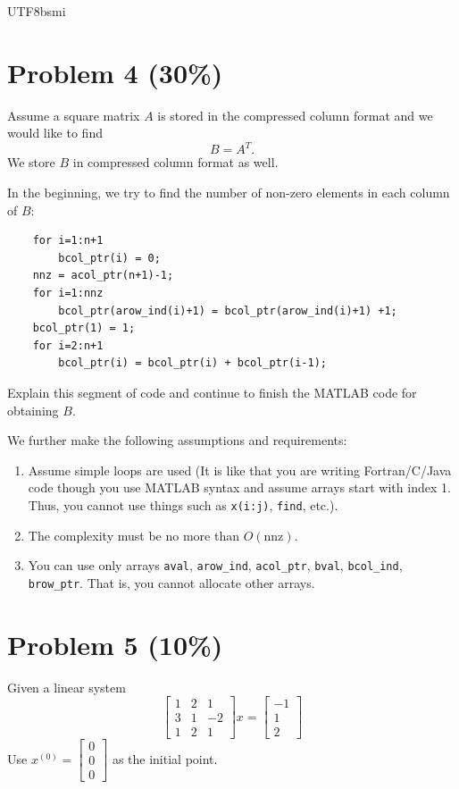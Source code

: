 \documentclass[12pt,a4paper]{article}
\begin{document}
\begin{CJK*}{UTF8}{bsmi}
\vspace{0.5cm}

\section*{Problem 4 (30\%)}
Assume a square matrix $A$ is stored in the compressed column format and we would like to find
\[
B = A^T .
\]
We store $B$ in compressed column format as well.

\vspace{0.25cm}
\noindent In the beginning, we try to find the number of non-zero elements in each column of $B$:

\begin{verbatim}
    for i=1:n+1
        bcol_ptr(i) = 0;
    nnz = acol_ptr(n+1)-1;
    for i=1:nnz
        bcol_ptr(arow_ind(i)+1) = bcol_ptr(arow_ind(i)+1) +1;
    bcol_ptr(1) = 1;
    for i=2:n+1
        bcol_ptr(i) = bcol_ptr(i) + bcol_ptr(i-1);
\end{verbatim}

\noindent Explain this segment of code and continue to finish the MATLAB code for obtaining $B$.

\vspace{0.25cm}
\noindent We further make the following assumptions and requirements:
\begin{enumerate}[(1)]
    \item Assume simple loops are used (It is like that you are writing Fortran/C/Java code though you use MATLAB syntax and assume arrays start with index 1. Thus, you cannot use things such as \texttt{x(i:j)}, \texttt{find}, etc.).
    \item The complexity must be no more than $O(\text{nnz})$.
    \item You can use only arrays \texttt{aval}, \texttt{arow\_ind}, \texttt{acol\_ptr}, \texttt{bval}, \texttt{bcol\_ind}, \texttt{brow\_ptr}. That is, you cannot allocate other arrays.
\end{enumerate}

\vspace{0.5cm}

\section*{Problem 5 (10\%)}
Given a linear system
\[
\begin{bmatrix}
1 & 2 & 1 \\
3 & 1 & -2 \\
1 & 2 & 1
\end{bmatrix}
x = 
\begin{bmatrix}
-1 \\ 1 \\ 2
\end{bmatrix}
\]
Use $x^{(0)} = \begin{bmatrix} 0 \\ 0 \\ 0 \end{bmatrix}$ as the initial point.


\end{CJK*}
\end{document}
